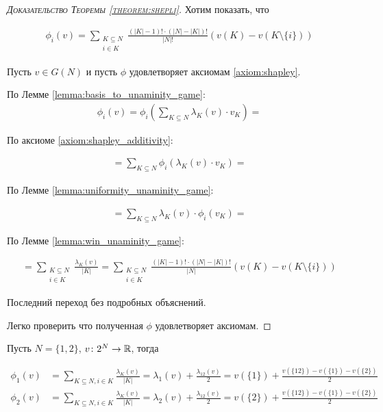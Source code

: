 \documentclass[../main.tex]{subfiles}
\begin{document}
\begin{proof}[\normalfont\textsc{Доказательство Теоремы \ref{theorem:shepli}}]
	Хотим показать, что 

	\begin{align*}
		\phi_i(v) = \sum_{\substack{K \subseteq N \\ i \in K}} \frac{(|K| - 1)! \cdot (|N| - |K|)!}{|N|!} (v(K) - v(K \setminus \{i\}))
	\end{align*}

	Пусть $v \in G(N)$ и пусть  $\phi$ удовлетворяет аксиомам \ref{axiom:shapley}.

	По Лемме \ref{lemma:basis_to_unaminity_game}:
	 \begin{align*}
		 \phi_i(v) = \phi_i \left(\sum_{K \subseteq N} \lambda_K (v) \cdot v_K\right) =
	\end{align*}

	По аксиоме \eqref{axiom:shapley_additivity}:

	\begin{align*}
		= \sum_{K \subseteq N} \phi_i(\lambda_K(v) \cdot v_K) =
	\end{align*}

	По Лемме \ref{lemma:uniformity_unaminity_game}:

	\begin{align*}
		= \sum_{K \subseteq N} \lambda_K(v) \cdot \phi_i(v_K) =
	\end{align*}

	По Лемме \ref{lemma:win_unaminity_game}:

	\begin{align*}
		= \sum_{\substack{K \subseteq N \\ i \in K}} \frac{\lambda_K(v)}{|K|} = \sum_{\substack{K \subseteq N \\ i \in K}} \frac{(|K| - 1)! \cdot (|N| - |K|)!}{|N|} (v(K) - v(K \setminus \{i\}))
	\end{align*}

	Последний переход без подробных объяснений.

	Легко проверить что полученная $\phi$ удовлетворяет аксиомам.

\end{proof}

\begin{exmpl}
	Пусть $N = \{1, 2\}$,  $v \colon 2^{N} \to \mathbb{R}$, тогда

	\begin{align*}
		\phi_1(v) &= \sum_{K \subseteq N, i \in K} \frac{\lambda_K(v)}{|K|} = \lambda_1(v) + \frac{\lambda_{12}(v)}{2} = v(\{1\}) + \frac{v(\{12\}) - v(\{1\}) - v(\{2\})}{2} \\
		\phi_2(v) &=  \sum_{K \subseteq N, i \in K} \frac{\lambda_K(v)}{|K|} = \lambda_2(v) + \frac{\lambda_{12}(v)}{2} = v(\{2\}) + \frac{v(\{12\}) - v(\{1\}) - v(\{2\})}{2}
	\end{align*}
\end{exmpl}
\end{document}
